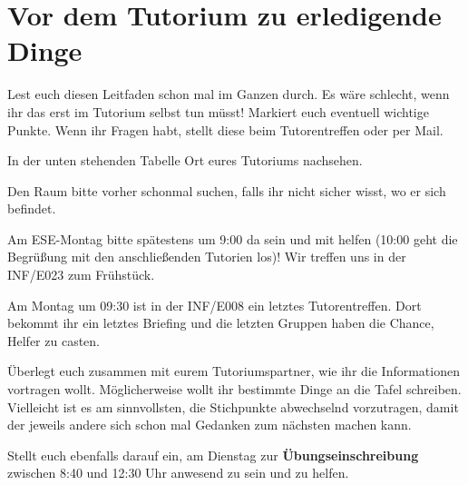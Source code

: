 \documentclass[a4paper,12pt]{report}
\begin{document}
\section{Vor dem Tutorium zu erledigende Dinge}
\begin{itemize*}
\item Lest euch diesen Leitfaden schon mal im Ganzen durch. Es wäre schlecht, wenn ihr das erst im Tutorium selbst tun müsst! Markiert euch eventuell wichtige Punkte. Wenn ihr Fragen habt, stellt diese beim Tutorentreffen oder per Mail.
\item In der unten stehenden Tabelle Ort eures Tutoriums nachsehen.
\item Den Raum bitte vorher schonmal suchen, falls ihr nicht sicher wisst, wo er sich befindet.
\item Am ESE-Montag bitte spätestens um 9:00 da sein und mit helfen (10:00 geht die Begrüßung mit den anschließenden Tutorien los)! Wir treffen uns in der INF/E023 zum Frühstück.
\item Am Montag um 09:30 ist in der INF/E008 ein letztes Tutorentreffen. Dort bekommt ihr ein letztes Briefing  und die letzten Gruppen haben die Chance, Helfer zu casten. 
\item Überlegt euch zusammen mit eurem Tutoriumspartner, wie ihr die Informationen vortragen wollt. Möglicherweise wollt ihr bestimmte Dinge an die Tafel schreiben. Vielleicht ist es am sinnvollsten, die Stichpunkte abwechselnd vorzutragen, damit der jeweils andere sich schon mal Gedanken zum nächsten machen kann.
\item Stellt euch ebenfalls darauf ein, am Dienstag zur \textbf{Übungseinschreibung} zwischen 8:40 und 12:30 Uhr anwesend zu sein und zu helfen.
\end{itemize*}
\end{document}
